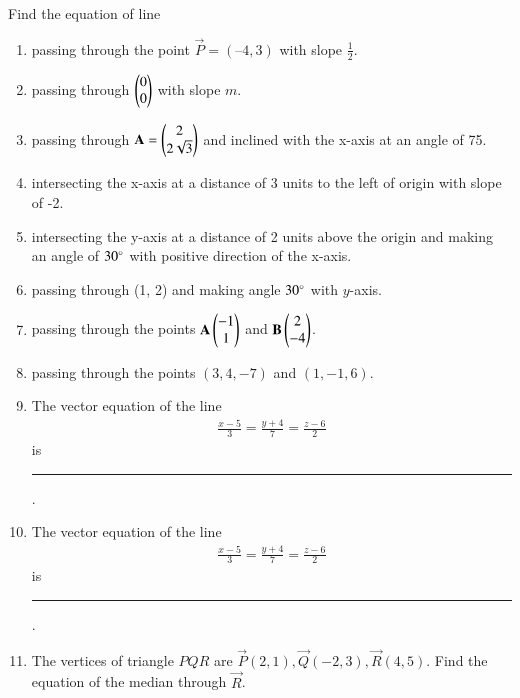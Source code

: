 Find the equation of line 
\begin{enumerate}[label=\thesubsection.\arabic*, ref=\thesubsection.\theenumi]
	\item passing through the point $\vec{P} = (– 4,  3)$ with slope $\frac{1}{2}$.
\label{chapters/11/10/2/2}
\\
\solution

	\item passing through $\begin{pmatrix}0\\0\end{pmatrix}$ with slope $m$.\\
\label{chapters/11/10/2/3}
\solution

    \item passing through 
    $\mathbf{A} = \begin{pmatrix}2\\2\sqrt{3}\end{pmatrix}$ and inclined with the x-axis at an angle 
    of 75\degree.
\label{chapters/11/10/2/4}
\\
    \solution 

\item intersecting the x-axis at a distance of 3 units to the left of origin with slope of -2.
\label{chapters/11/10/2/5}
\\
\solution 

\item intersecting the y-axis at a distance of 2 units above the origin and making an
angle of $30\degree$ with positive direction of the x-axis.
\\
\solution 

\item passing through (1, 2) and making angle $30\degree$ with $y$-axis.
\item passing through the points $\mathbf{A}\begin{pmatrix}-1\\1\end{pmatrix}$ and $\mathbf{B}\begin{pmatrix}2\\-4\end{pmatrix}$.
\label{chapters/11/10/2/7}
\\
\solution 

\item passing through the points $(3, 4, -7)$ and $(1, -1, 6)$. 
\item The vector equation of the line 
\begin{align*}
	\frac{x-5}{3}=\frac{y+4}{7}=\frac{z-6}{2} 
\end{align*}
is \noindent\rule{2cm}{0.4pt}. 
\item The vector equation of the line 
\begin{align*}
	\frac{x-5}{3}=\frac{y+4}{7}=\frac{z-6}{2}
\end{align*}
 is \noindent\rule{2cm}{0.4pt}.
\item 
The vertices of triangle $PQR$ are $\vec{P}(2, 1),  \vec{Q}(-2, 3),  \vec{R}(4, 5)$. Find the equation of the median through $\vec{R}$.

\end{enumerate}
